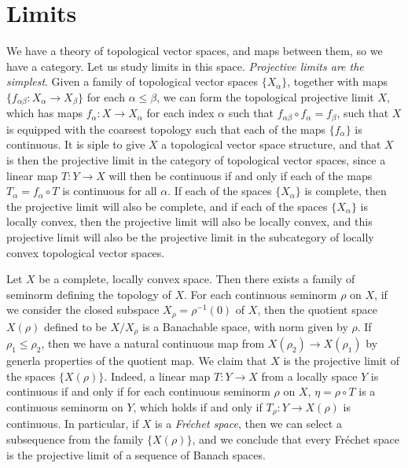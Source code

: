 \section{Limits}

We have a theory of topological vector spaces, and maps between them, so we have a category. Let us study  limits in this space. \emph{Projective limits are the simplest}. Given a family of topological vector spaces $\{ X_\alpha \}$, together with maps $\{ f_{\alpha \beta}: X_\alpha \to X_\beta \}$ for each $\alpha \leq \beta$, we can form the topological projective limit $X$, which has maps $f_\alpha: X \to X_\alpha$ for each index $\alpha$ such that $f_{\alpha \beta} \circ f_\alpha = f_\beta$, such that $X$ is equipped with the coarsest topology such that each of the maps $\{ f_\alpha \}$ is continuous. It is siple to give $X$ a topological vector space structure, and that $X$ is then the projective limit in the category of topological vector spaces, since a linear map $T: Y \to X$ will then be continuous if and only if each of the maps $T_\alpha = f_\alpha \circ T$ is continuous for all $\alpha$. If each of the spaces $\{ X_\alpha \}$ is complete, then the projective limit will also be complete, and if each of the spaces $\{ X_\alpha \}$ is locally convex, then the projective limit will also be locally convex, and this projective limit will also be the projective limit in the subcategory of locally convex topological vector spaces.

\begin{example}
    Let $X$ be a complete, locally convex space. Then there exists a family of seminorm defining the topology of $X$. For each continuous seminorm $\rho$ on $X$, if we consider the closed subspace $X_\rho = \rho^{-1}(0)$ of $X$, then the quotient space $X(\rho)$ defined to be $X / X_\rho$ is a Banachable space, with norm given by $\rho$. If $\rho_1 \leq \rho_2$, then we have a natural continuous map from $X(\rho_2) \to X(\rho_1)$ by generla properties of the quotient map. We claim that $X$ is the projective limit of the spaces $\{ X(\rho) \}$. Indeed, a linear map $T: Y \to X$ from a locally space $Y$ is continuous if and only if for each continuous seminorm $\rho$ on $X$, $\eta = \rho \circ T$ is a continuous seminorm on $Y$, which holds if and only if $T_\rho: Y \to X(\rho)$ is continuous. In particular, if $X$ is a \emph{Fr\'{e}chet space}, then we can select a subsequence from the family $\{ X(\rho) \}$, and we conclude that every Fr\'{e}chet space is the projective limit of a sequence of Banach spaces.
\end{example}

